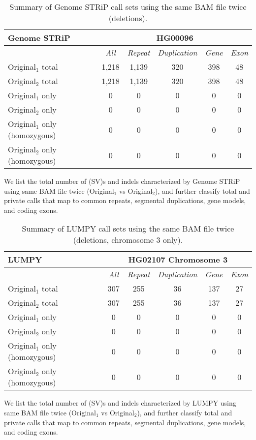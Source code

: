 \begin{table}[htb]
\caption{ Summary of Genome STRiP call sets using the same BAM file twice (deletions). }
\begin{center}
\begin{tabular}{|l|c||c|c|c|c|}
\hline
{\bf Genome STRiP} & \multicolumn{5}{|c|}{\bf HG00096} \\
\hline
\cline{2-6}
{\bf} & {\it All} & {\it Repeat} & {\it Duplication} & {\it Gene} & {\it Exon} \\
\hline
Original$_1$ total & 1,218 & 1,139 & 320 & 398 & 48 \\
\hline
Original$_2$ total & 1,218 & 1,139 & 320 & 398 & 48 \\
\hline
Original$_1$ only & 0 & 0 & 0 & 0 & 0\\ 
\hline
Original$_2$ only & 0 & 0 & 0 & 0 & 0\\
\hline
Original$_1$ only (homozygous) & 0 & 0 & 0 & 0 & 0\\ 
\hline
Original$_2$ only (homozygous) & 0 & 0 & 0 & 0 & 0\\  
\hline
\end{tabular}
\end{center}
{\footnotesize We list the total number of (SV)s and indels characterized by Genome STRiP using same BAM file twice (Original$_1$ vs Original$_2$), 
and further classify total and private calls that map to common repeats, segmental duplications, gene models, and coding exons.}
\label{supptab:orig-vs-orig2-svtoolkit}
\end{table}

\begin{table}[htb]
\caption{ Summary of LUMPY call sets using the same BAM file twice (deletions, chromosome 3 only). }
\begin{center}
\begin{tabular}{|l|c||c|c|c|c|}
\hline
{\bf LUMPY} & \multicolumn{5}{|c|}{\bf HG02107 Chromosome 3} \\
\hline
\cline{2-6}
{\bf} & {\it All} & {\it Repeat} & {\it Duplication} & {\it Gene} & {\it Exon} \\
\hline
Original$_1$ total & 307 & 255 & 36 & 137 & 27 \\
\hline
Original$_2$ total & 307 & 255 & 36 & 137 & 27 \\
\hline
Original$_1$ only & 0 & 0 & 0 & 0 & 0\\ 
\hline
Original$_2$ only & 0 & 0 & 0 & 0 & 0\\
\hline
Original$_1$ only (homozygous) & 0 & 0 & 0 & 0 & 0\\ 
\hline
Original$_2$ only (homozygous) & 0 & 0 & 0 & 0 & 0\\  
\hline
\end{tabular}
\end{center}
{\footnotesize We list the total number of (SV)s and indels characterized by LUMPY using same BAM file twice (Original$_1$ vs Original$_2$), 
and further classify total and private calls that map to common repeats, segmental duplications, gene models, and coding exons.}
\label{supptab:orig-vs-orig2-lumpy}
\end{table}
